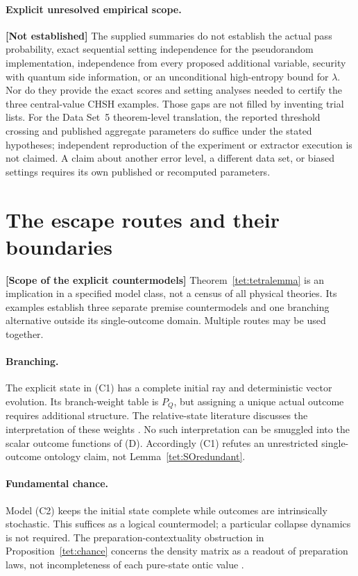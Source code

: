 \documentclass[11pt,a4paper]{article}
\theoremstyle{definition}
\theoremstyle{remark}\newtheorem{remark}[theorem]{Remark}
\newcommand{\status}[1]{\textbf{[#1]}\quad}
\begin{document}
\paragraph{Explicit unresolved empirical scope.}
\status{Not established}
The supplied summaries do not establish the actual pass probability, exact sequential setting independence for the pseudorandom implementation, independence from every proposed additional variable, security with quantum side information, or an unconditional high-entropy bound for $\lambda$. Nor do they provide the exact scores and setting analyses needed to certify the three central-value CHSH examples. Those gaps are not filled by inventing trial lists. For the Data Set~5 theorem-level translation, the reported threshold crossing and published aggregate parameters do suffice under the stated hypotheses; independent reproduction of the experiment or extractor execution is not claimed. A claim about another error level, a different data set, or biased settings requires its own published or recomputed parameters.

\section{The escape routes and their boundaries}\label{esc:section}
\status{Scope of the explicit countermodels}
Theorem~\ref{tet:tetralemma} is an implication in a specified model class, not a census of all physical theories. Its examples establish three separate premise countermodels and one branching alternative outside its single-outcome domain. Multiple routes may be used together.

\paragraph{Branching.}
The explicit state in (C1) has a complete initial ray and deterministic vector evolution. Its branch-weight table is $P_Q$, but assigning a unique actual outcome requires additional structure. The relative-state literature discusses the interpretation of these weights \cite{Everett57,Deutsch99,Wallace12}. No such interpretation can be smuggled into the scalar outcome functions of (D). Accordingly (C1) refutes an unrestricted single-outcome ontology claim, not Lemma~\ref{tet:SOredundant}.

\paragraph{Fundamental chance.}
Model (C2) keeps the initial state complete while outcomes are intrinsically stochastic. This suffices as a logical countermodel; a particular collapse dynamics is not required. The preparation-contextuality obstruction in Proposition~\ref{tet:chance} concerns the density matrix as a readout of preparation laws, not incompleteness of each pure-state ontic value \cite{BB95,S05}.
\end{document}
